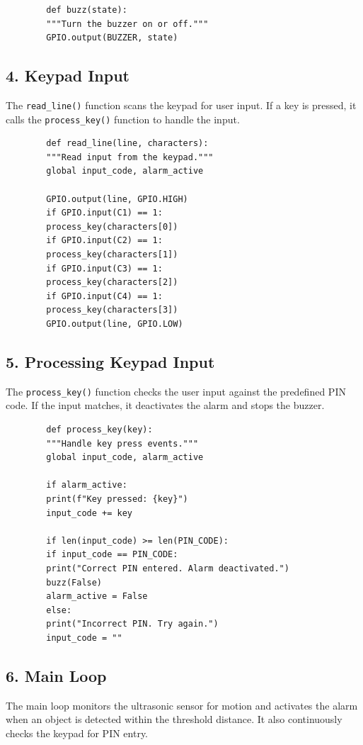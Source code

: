 \documentclass{article}
\begin{document}
	\begin{lstlisting}
		def buzz(state):
		"""Turn the buzzer on or off."""
		GPIO.output(BUZZER, state)
	\end{lstlisting}
	
	\subsection*{4. Keypad Input}
	The \texttt{read\_line()} function scans the keypad for user input. If a key is pressed, it calls the \texttt{process\_key()} function to handle the input.
	
	\begin{lstlisting}
		def read_line(line, characters):
		"""Read input from the keypad."""
		global input_code, alarm_active
		
		GPIO.output(line, GPIO.HIGH)
		if GPIO.input(C1) == 1:
		process_key(characters[0])
		if GPIO.input(C2) == 1:
		process_key(characters[1])
		if GPIO.input(C3) == 1:
		process_key(characters[2])
		if GPIO.input(C4) == 1:
		process_key(characters[3])
		GPIO.output(line, GPIO.LOW)
	\end{lstlisting}
	
	\subsection*{5. Processing Keypad Input}
	The \texttt{process\_key()} function checks the user input against the predefined PIN code. If the input matches, it deactivates the alarm and stops the buzzer.
	
	\begin{lstlisting}
		def process_key(key):
		"""Handle key press events."""
		global input_code, alarm_active
		
		if alarm_active:
		print(f"Key pressed: {key}")
		input_code += key
		
		if len(input_code) >= len(PIN_CODE):
		if input_code == PIN_CODE:
		print("Correct PIN entered. Alarm deactivated.")
		buzz(False)
		alarm_active = False
		else:
		print("Incorrect PIN. Try again.")
		input_code = ""
	\end{lstlisting}
	
	\subsection*{6. Main Loop}
	The main loop monitors the ultrasonic sensor for motion and activates the alarm when an object is detected within the threshold distance. It also continuously checks the keypad for PIN entry.
	
\end{document}

